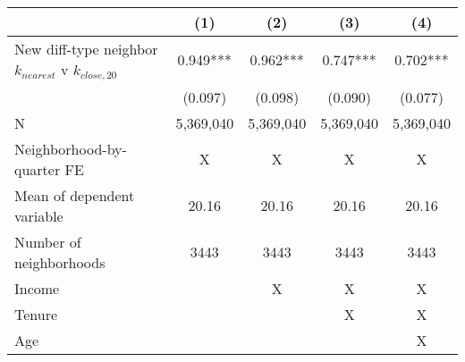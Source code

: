 \begin{tabular}{lcccc}
\toprule
  & (1) & (2) & (3) & (4) \\ 
\midrule
New diff-type neighbor $k_{nearest}$ v $k_{close,20}$ & 0.949*** & 0.962*** & 0.747*** & 0.702*** \\ 
 & (0.097) & (0.098) & (0.090) & (0.077) \\ 
\midrule
N & 5,369,040 & 5,369,040 & 5,369,040 & 5,369,040 \\ 
Neighborhood-by-quarter FE & X & X & X & X \\ 
Mean of dependent variable & 20.16 & 20.16 & 20.16 & 20.16 \\ 
Number of neighborhoods & 3443 & 3443 & 3443 & 3443 \\ 
Income &  & X & X & X \\ 
Tenure &  &  & X & X \\ 
Age &  &  &  & X \\ 
\bottomrule
\end{tabular}